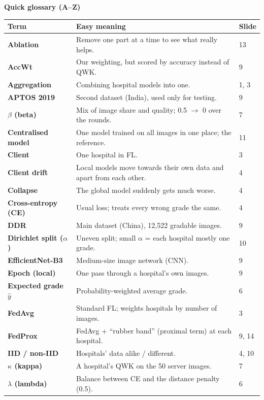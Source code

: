 \documentclass[11pt,a4paper]{article}
\begin{document}
\newpage
{\color{navy}\Large\bfseries Quick glossary (A--Z)}\par\smallskip
{\small
\begin{longtable}{@{}>{\bfseries}p{3.6cm}p{11.1cm}>{\leavevmode\color{muted}}p{0.9cm}@{}}
\toprule
Term & Easy meaning & Slide\\ \midrule\endhead
Ablation & Remove one part at a time to see what really helps. & 13\\
AccWt & Our weighting, but scored by accuracy instead of QWK. & 9\\
Aggregation & Combining hospital models into one. & 1, 3\\
APTOS 2019 & Second dataset (India), used only for testing. & 9\\
$\beta$ (beta) & Mix of image share and quality; 0.5 $\rightarrow$ 0 over the rounds. & 7\\
Centralised model & One model trained on all images in one place; the reference. & 11\\
Client & One hospital in FL. & 3\\
Client drift & Local models move towards their own data and apart from each other. & 4\\
Collapse & The global model suddenly gets much worse. & 4\\
Cross-entropy (CE) & Usual loss; treats every wrong grade the same. & 4\\
DDR & Main dataset (China), 12,522 gradable images. & 9\\
Dirichlet split ($\alpha$) & Uneven split; small $\alpha$ = each hospital mostly one grade. & 10\\
EfficientNet-B3 & Medium-size image network (CNN). & 9\\
Epoch (local) & One pass through a hospital's own images. & 9\\
Expected grade $\hat{y}$ & Probability-weighted average grade. & 6\\
FedAvg & Standard FL; weights hospitals by number of images. & 3\\
FedProx & FedAvg + ``rubber band'' (proximal term) at each hospital. & 9, 14\\
IID / non-IID & Hospitals' data alike / different. & 4, 10\\
$\kappa$ (kappa) & A hospital's QWK on the 50 server images. & 7\\
$\lambda$ (lambda) & Balance between CE and the distance penalty (0.5). & 6\\

\end{longtable}}
\end{document}
